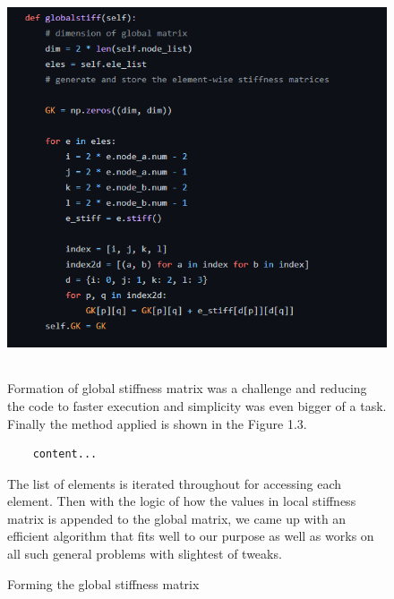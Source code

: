 \documentclass[a4paper,12pt]{report}
\begin{document}
\begin{figure}
\includegraphics[width = 14cm, height = 11cm]{gm}
\caption{Forming the global stiffness matrix}
\vspace{1cm}
Formation of global stiffness matrix was a challenge and reducing the code to faster execution and simplicity was even bigger of a task. Finally the method applied is shown in the Figure 1.3.\\

\begin{verbatim}
	content...
\end{verbatim}
	
 The list of elements is iterated throughout for accessing each element. Then with the logic of how the values in local stiffness matrix is appended to the global matrix, we came up with an efficient algorithm that fits well to our purpose as well as works on all such general problems with slightest of tweaks.
\end{figure}
\end{document}
